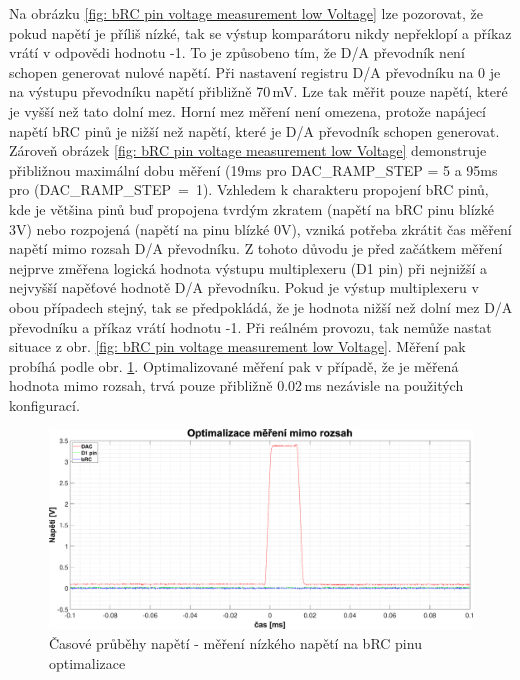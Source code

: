 Na obrázku \ref{fig: bRC pin voltage measurement low Voltage} lze pozorovat, že pokud napětí je příliš nízké, tak se výstup komparátoru nikdy nepřeklopí a 
příkaz vrátí v odpovědi hodnotu -1.
To je způsobeno tím, že D/A převodník není schopen generovat nulové napětí.
Při nastavení registru D/A převodníku na 0 je na výstupu převodníku napětí přibližně 70\,mV.
Lze tak měřit pouze napětí, které je vyšší než tato dolní mez. Horní mez měření není omezena, protože napájecí napětí bRC pinů je nižší než napětí,
které je D/A převodník schopen generovat. Zároveň obrázek \ref{fig: bRC pin voltage measurement low Voltage} demonstruje přibližnou maximální dobu
měření (19ms pro DAC\_RAMP\_STEP = 5 a 95ms pro \mbox{(DAC\_RAMP\_STEP = 1)}.
\clearpage
Vzhledem k charakteru propojení bRC pinů, kde je většina pinů buď propojena tvrdým zkratem
(napětí na bRC pinu blízké 3V) nebo rozpojená (napětí na pinu blízké 0V),
vzniká potřeba zkrátit čas měření napětí mimo rozsah D/A převodníku.
Z tohoto důvodu je před začátkem měření nejprve změřena logická hodnota výstupu multiplexeru (D1 pin) při
nejnižší a nejvyšší napěťové hodnotě D/A převodníku.
Pokud je výstup multiplexeru v obou případech stejný, tak se předpokládá, že je hodnota nižší než dolní mez D/A převodníku
a příkaz vrátí hodnotu -1. Při reálném provozu, tak nemůže nastat situace z obr. \ref{fig: bRC pin voltage measurement low Voltage}.
Měření pak probíhá podle obr. \ref{fig: bRC pin voltage measurement low Voltage opt}.
Optimalizované měření pak v případě, že je měřená hodnota mimo rozsah,
trvá pouze přibližně 0.02\,ms nezávisle na použitých konfigurací.\par

\begin{figure}[ht!]
    \centering
    \includegraphics[width = 1\textwidth]{obrazky/matlab_generated/pin_out_of_range_opt.eps}
    \caption{Časové průběhy napětí - měření nízkého napětí na bRC pinu optimalizace}
    \label{fig: bRC pin voltage measurement low Voltage opt}
\end{figure}


